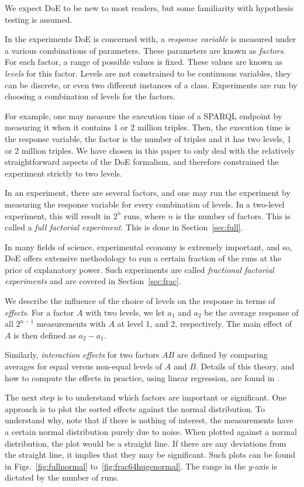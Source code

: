 \documentclass{llncs}
\begin{document}
We expect DoE to be new to most readers, but some familiarity with
hypothesis testing is assumed.

In the experiments DoE is concerned with, a \emph{response variable}
is measured under a various combinations of parameters.  These
parameters are known as \emph{factors}.  For each factor, a range of
possible values is fixed.  These values are known as \emph{levels} for
this factor.  Levels are not constrained to be continuous variables, they
can be discrete, or even two different instances of a class.
Experiments are run by choosing a combination of levels
for the factors.

For example, one may measure the execution time of a SPARQL endpoint
by measuring it when it contains 1 or 2 million triples.  Then, the
execution time is the response variable, the factor is the number of
triples and it has two levels, 1 or 2 million triples. We have chosen
in this paper to only deal with the relatively straightforward aspects
of the DoE formalism, and therefore constrained the experiment strictly
to two levels.

In an experiment, there are several factors, and one may run the
experiment by measuring the response variable for every combination of
levels. In a two-level experiment, this will result in $2^n$ runs,
where $n$ is the number of factors. This is called a \emph{full
  factorial experiment}. This is done in Section~\ref{sec:full}.


In many fields of science, experimental economy is extremely
important, and so, DoE offers extensive methodology to run a certain
fraction of the runs at the price of explanatory power. Such
experiments are called \emph{fractional factorial experiments} and are
covered in Section~\ref{sec:frac}.

We describe the influence of the choice of levels on the response in
terms of \emph{effects}.  For a factor $A$ with two levels, we let
$a_1$ and $a_2$ be the average response of all $2^{n-1}$ measurements
with $A$ at level 1, and 2, respectively.  The main effect of $A$ is
then defined as $a_2 - a_1$.

Similarly, \emph{interaction effects} for two factors $AB$ are defined
by comparing averages for equal versus non-equal levels of $A$ and
$B$.  Details of this theory, and how to compute the effects in
practice, using linear regression, are found in
\cite{wu2009experiments}.

The next step is to understand which factors are important or
significant.  One approach is to plot the sorted effects against the
normal distribution. To understand why, note that if there is nothing
of interest, the measurements have a certain normal distribution
purely due to noise. When plotted against a normal distribution, the
plot would be a straight line. If there are any deviations from the
straight line, it implies that they may be significant. Such plots can
be found in
Figs.~\ref{fig:fullnormal} to~\ref{fig:frac64hugenormal}. The
range in the $y$-axis is dictated by the number of runs.
\end{document}

